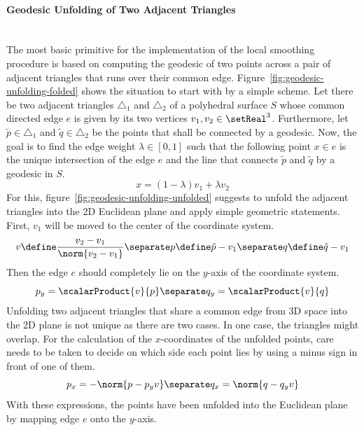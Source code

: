 \documentclass{stdlocal}
\begin{document}
  \paragraph{Geodesic Unfolding of Two Adjacent Triangles}\hfill\\
  The most basic primitive for the implementation of the local smoothing procedure is based on computing the geodesic of two points across a pair of adjacent triangles that runs over their common edge.
  Figure~\ref{fig:geodesic-unfolding-folded} shows the situation to start with by a simple scheme.
  Let there be two adjacent triangles $\triangle_1$ and $\triangle_2$ of a polyhedral surface $S$ whose common directed edge $e$ is given by its two vertices $v_1,v_2\in\setReal^3$.
  Furthermore, let $\tilde{p}\in\triangle_1$ and $\tilde{q}\in\triangle_2$ be the points that shall be connected by a geodesic.
  Now, the goal is to find the edge weight $λ\in[0,1]$ such that the following point $x\in e$ is the unique intersection of the edge $e$ and the line that connects $\tilde{p}$ and $\tilde{q}$ by a geodesic in $S$.
  \[
    x = (1-λ)v_1 + λv_2
  \]
  For this, figure~\ref{fig:geodesic-unfolding-unfolded} suggests to unfold the adjacent triangles into the 2D Euclidean plane and apply simple geometric statements.
  First, $v_1$ will be moved to the center of the coordinate system.
  \[
    v \define \frac{v_2 - v_1}{\norm{v_2 - v_1}}
    \separate
    p \define \tilde{p} - v_1
    \separate
    q \define \tilde{q} - v_1
  \]
  Then the edge $e$ should completely lie on the $y$-axis of the coordinate system.
  \[
    p_y = \scalarProduct{v}{p}
    \separate
    q_y = \scalarProduct{v}{q}
  \]
  Unfolding two adjacent triangles that share a common edge from 3D space into the 2D plane is not unique as there are two cases.
  In one case, the triangles might overlap.
  For the calculation of the $x$-coordinates of the unfolded points, care needs to be taken to decide on which side each point lies by using a minus sign in front of one of them.
  \[
    p_x = -\norm{p - p_y v}
    \separate
    q_x = \norm{q - q_y v}
  \]
  With these expressions, the points have been unfolded into the Euclidean plane by mapping edge $e$ onto the $y$-axis.
\end{document}
